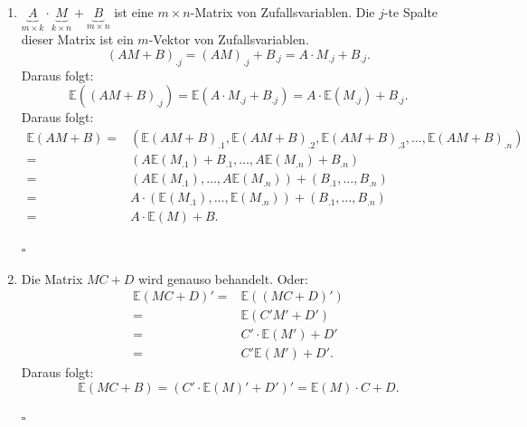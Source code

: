 \documentclass[10pt]{article}
\newcommand{\EW}{\mathbb{E}} %
\newenvironment{BWS}[1][]
{\begin{Beweis}[frametitle=#1]}{\end{Beweis}}
\begin{document}
\begin{BWS}[Beweis 3.0.1 (Linearität des Erwartungswertes)]
\begin{enumerate}
\begin{equation*}
						\right)
					\end{equation*}
					\item $\underbrace{A}_{m \times k} \cdot \underbrace{M}_{k\times n} + \underbrace{B}_{m \times n}$ ist eine $m \times n$-Matrix von Zufallsvariablen. Die $j$-te Spalte dieser Matrix ist ein $m$-Vektor von Zufallsvariablen. 
					\begin{equation*}
						(AM+ B)_{.j} = (AM)_{.j}+B_{.j} = A \cdot M_{.j} + B_{.j}. 
					\end{equation*}
					Daraus folgt:
					\begin{equation*}
						\EW((AM+B)_{.j}) = \EW (A \cdot M_{.j} + B_{.j}) = A \cdot \EW(M_{.j}) + B_{.j}.
					\end{equation*}
					Daraus folgt:
					\begin{equation*}
						\begin{split}
							\EW(AM+B) =& (\EW(AM+B)_{.1},\EW(AM+B)_{.2},\EW(AM+B)_{.3},\ldots,\EW(AM+B)_{.n})\\
							=& (A\EW(M_{.1})+B_{.1}, \ldots, A\EW(M_{.n})+B_{.n})\\
							=&(A\EW(M_{.1}), \ldots, A\EW(M_{.n})) + (B_{.1}, \ldots, B_{.n})\\
							=& A \cdot (\EW(M_{.1}), \ldots, \EW(M_{.n})) + (B_{.1}, \ldots, B_{.n})\\
							=& A \cdot \EW(M) + B.
						\end{split}
					\end{equation*}
					\begin{flushright}
						$\square$
					\end{flushright}
					\item Die Matrix $MC+D$ wird genauso behandelt. Oder:
					\begin{equation*}
						\begin{split}
							\EW(MC+D)' =& \EW((MC+D)')\\
							=& \EW(C'M'+D')\\
							=& C' \cdot \EW(M') + D'\\
							=& C' \EW(M')+D'.
						\end{split}
					\end{equation*}
					Daraus folgt:
					\begin{equation*}
						\EW(MC+B) = (C' \cdot \EW(M)' + D')' = \EW(M) \cdot C + D.
					\end{equation*}
					\begin{flushright}
						$\square$
					\end{flushright}
				\end{enumerate}
			\end{BWS}
			
\end{document}
